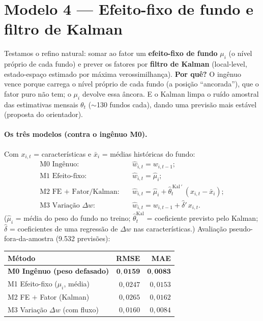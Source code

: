 \documentclass[11pt]{article}
\begin{document}
\section{Modelo 4 — Efeito-fixo de fundo e filtro de Kalman}

Testamos o refino natural: somar ao fator um \textbf{efeito-fixo de fundo} $\mu_i$ (o
nível próprio de cada fundo) e prever os fatores por \textbf{filtro de Kalman}
(local-level, estado-espaço estimado por máxima verossimilhança). \textbf{Por quê?} O
ingênuo vence porque carrega o nível próprio de cada fundo (a posição ``ancorada''), que
o fator puro não tem; o $\mu_i$ devolve essa âncora. E o Kalman limpa o ruído amostral
das estimativas mensais $\theta_t$ ($\sim$130 fundos cada), dando uma previsão mais
estável (proposta do orientador).

\paragraph{Os três modelos (contra o ingênuo M0).} Com $x_{i,t}$ = características e
$\bar x_i$ = médias históricas do fundo:
\begin{align*}
\text{M0 Ingênuo:}\quad        & \widehat{w}_{i,t}=w_{i,t-1};\\
\text{M1 Efeito-fixo:}\quad    & \widehat{w}_{i,t}=\widehat{\mu}_i;\\
\text{M2 FE + Fator/Kalman:}\quad & \widehat{w}_{i,t}=\widehat{\mu}_i+\widehat{\theta}_t^{\,\text{Kal}\,\prime}\,(x_{i,t}-\bar x_i);\\
\text{M3 Variação }\Delta w:\quad & \widehat{w}_{i,t}=w_{i,t-1}+\widehat{\delta}'\,x_{i,t}.
\end{align*}
\noindent ($\widehat{\mu}_i$ = média do peso do fundo no treino; $\widehat{\theta}_t^{\text{Kal}}$
= coeficiente previsto pelo Kalman; $\widehat{\delta}$ = coeficientes de uma regressão de
$\Delta w$ nas características.) Avaliação pseudo-fora-da-amostra (9.532 previsões):

\begin{table}[h]\centering
\begin{tabular}{@{}lrr@{}}
\toprule
Método & RMSE & MAE \\
\midrule
\textbf{M0 Ingênuo (peso defasado)} & $\mathbf{0{,}0159}$ & $\mathbf{0{,}0083}$ \\
M1 Efeito-fixo ($\mu_i$, média)     & $0{,}0247$ & $0{,}0153$ \\
M2 FE $+$ Fator (Kalman)            & $0{,}0265$ & $0{,}0162$ \\
M3 Variação $\Delta w$ (com fluxo)  & $0{,}0160$ & $0{,}0084$ \\
\bottomrule
\end{tabular}
\end{table}
\end{document}
